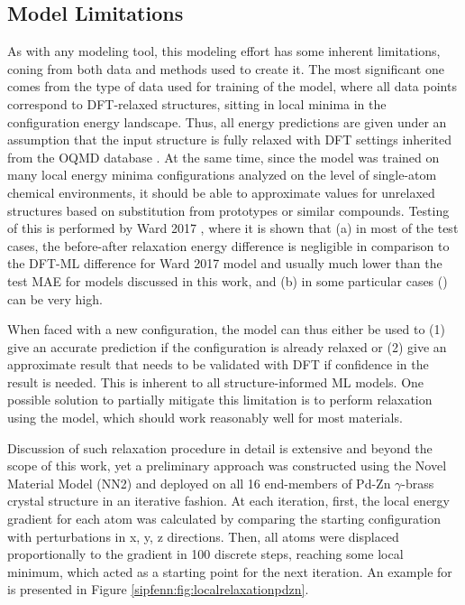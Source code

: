 \subsection{Model Limitations} \label{sipfenn:ssec:modellimitations}
As with any modeling tool, this modeling effort has some inherent limitations, coning from both data and methods used to create it. The most significant one comes from the type of data used for training of the model, where all data points correspond to DFT-relaxed structures, sitting in local minima in the configuration energy landscape. Thus, all energy predictions are given under an assumption that the input structure is fully relaxed with DFT settings inherited from the OQMD database \cite{Saal2013MaterialsOQMD}. At the same time, since the model was trained on many local energy minima configurations analyzed on the level of single-atom chemical environments, it should be able to approximate values for unrelaxed structures based on substitution from prototypes or similar compounds. Testing of this is performed by Ward 2017 \cite{Ward2017IncludingTessellations}, where it is shown that (a) in most of the test cases, the before-after relaxation energy difference is negligible in comparison to the DFT-ML difference for Ward 2017 model and usually much lower than the test MAE for models discussed in this work, and (b) in some particular cases () can be very high.

When faced with a new configuration, the model can thus either be used to (1) give an accurate prediction if the configuration is already relaxed or (2) give an approximate result that needs to be validated with DFT if confidence in the result is needed. This is inherent to all structure-informed ML models. One possible solution to partially mitigate this limitation is to perform relaxation using the model, which should work reasonably well for most materials. 

Discussion of such relaxation procedure in detail is extensive and beyond the scope of this work, yet a preliminary approach was constructed using the Novel Material Model (NN2) and deployed on all 16 end-members of Pd-Zn $\gamma$-brass crystal structure in an iterative fashion. At each iteration, first, the local energy gradient for each atom was calculated by comparing the starting configuration with perturbations in x, y, z directions. Then, all atoms were displaced proportionally to the gradient in 100 discrete steps, reaching some local minimum, which acted as a starting point for the next iteration. An example for  is presented in Figure \ref{sipfenn:fig:localrelaxationpdzn}.

